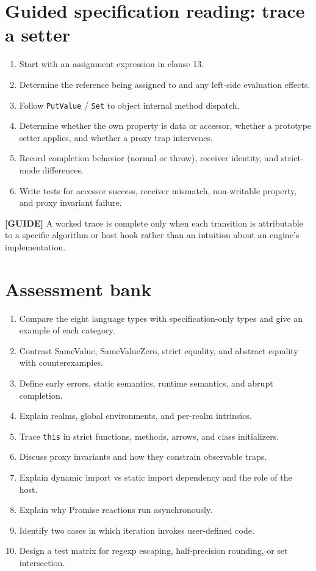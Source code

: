 \documentclass[11pt,letterpaper]{article}
\providecommand{\tightlist}{\setlength{\itemsep}{0pt}\setlength{\parskip}{0pt}}
\newcommand{\passthrough}[1]{#1}
\begin{document}
\section{Guided specification reading: trace a setter}\label{guided-specification-reading-trace-a-setter}

\begin{enumerate}
\def\labelenumi{\arabic{enumi}.}
\tightlist
\item
  Start with an assignment expression in clause 13.
\item
  Determine the reference being assigned to and any left-side evaluation effects.
\item
  Follow \passthrough{\lstinline!PutValue!} / \passthrough{\lstinline!Set!} to object internal method dispatch.
\item
  Determine whether the own property is data or accessor, whether a prototype setter applies, and whether a proxy trap intervenes.
\item
  Record completion behavior (normal or throw), receiver identity, and strict-mode differences.
\item
  Write tests for accessor success, receiver mismatch, non-writable property, and proxy invariant failure.
\end{enumerate}

\textbf{{[}GUIDE{]}} A worked trace is complete only when each transition is attributable to a specific algorithm or host hook rather than an intuition about an engine's implementation.

\section{Assessment bank}\label{assessment-bank}

\begin{enumerate}
\def\labelenumi{\arabic{enumi}.}
\tightlist
\item
  Compare the eight language types with specification-only types and give an example of each category.
\item
  Contrast SameValue, SameValueZero, strict equality, and abstract equality with counterexamples.
\item
  Define early errors, static semantics, runtime semantics, and abrupt completion.
\item
  Explain realms, global environments, and per-realm intrinsics.
\item
  Trace \passthrough{\lstinline!this!} in strict functions, methods, arrows, and class initializers.
\item
  Discuss proxy invariants and how they constrain observable traps.
\item
  Explain dynamic import vs static import dependency and the role of the host.
\item
  Explain why Promise reactions run asynchronously.
\item
  Identify two cases in which iteration invokes user-defined code.
\item
  Design a test matrix for regexp escaping, half-precision rounding, or set intersection.
\end{enumerate}
\end{document}
